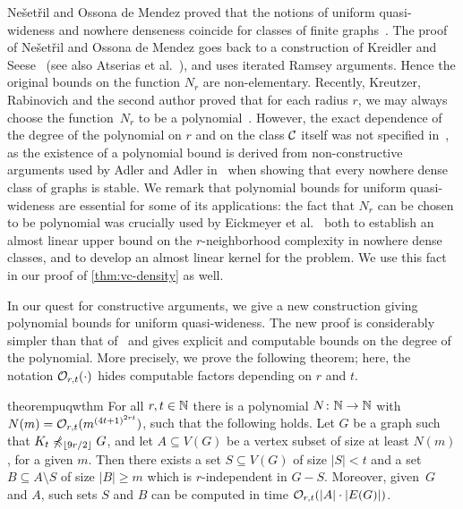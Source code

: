 Ne\v{s}et\v{r}il and Ossona de Mendez proved that
the notions of uniform quasi-wideness and nowhere denseness coincide for 
classes of finite graphs~\cite{nevsetvril2011nowhere}. 
The proof of Ne\v{s}et\v{r}il 
and Ossona de Mendez goes back to a construction
of Kreidler and Seese~\cite{kreidler1998monadic} (see also Atserias et al.~\cite{atserias2006preservation}), 
and uses iterated Ramsey arguments. Hence the original bounds on 
the function $N_r$ are non-elementary. Recently, Kreutzer, Rabinovich and the second author
 proved that for each radius $r$, we may always choose the function~$N_r$ to be a polynomial~\cite{siebertz2016polynomial}. 
 However, the exact dependence of the degree of the polynomial on $r$ and on the class $\mathcal{C}$ itself
 was not specified in~\cite{siebertz2016polynomial}, as the existence of a polynomial bound is derived
from non-constructive arguments used by Adler and Adler in~\cite{adler2014interpreting} when showing that every nowhere dense class of graphs
is stable. We remark that polynomial bounds for uniform quasi-wideness are essential for some of its applications:
the fact that $N_r$ can be chosen to be polynomial was crucially used by Eickmeyer et al.~\cite{eickmeyer2016neighborhood} both to establish an almost linear upper bound on the
$r$-neighborhood complexity in nowhere dense classes, and to develop an almost linear kernel for the {} problem.
We use this fact in our proof of \cref{thm:vc-density} as well.

In our quest for constructive arguments, we give a new construction giving polynomial bounds for uniform quasi-wideness.
The new proof is considerably simpler than that of~\cite{siebertz2016polynomial}
and gives explicit and computable bounds on the degree of the polynomial.
More precisely, we prove the following theorem; here, the notation $\mathcal{O}_{r,t}(\cdot)$ hides computable factors depending on $r$ and $t$.

\begin{restatable}{theorem}{puqwthm}\label{thm:new-uqw}
For all $r,t\in \mathbb{N}$ there is a polynomial  $N\colon \mathbb{N}\to \mathbb{N}$ with $N(m)=
\mathcal{O}_{r,t}{(m^{{(4t+1)}^{2rt}})}$, such that the following holds.
Let $G$ be a graph such that $K_t\not\preccurlyeq_{\lfloor 9r/2\rfloor} G$, and
let $A\subseteq V(G)$ be a vertex subset of size at least $N(m)$, for a given $m$.
Then there exists a set $S\subseteq V(G)$ of size $|S|<t$ and a set $B\subseteq A\setminus S$ 
of size $|B|\geq m$ which is $r$-independent in $G-S$.
Moreover, given~$G$ and $A$, such sets $S$ and $B$ can be computed in time $\mathcal{O}_{r,t}(|A|\cdot |E(G)|)$. 
\end{restatable}

